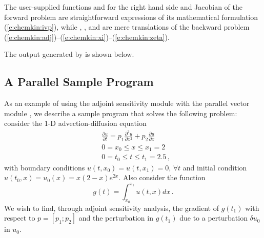 The user-supplied functions  and  for the right hand side and
Jacobian of the forward problem are straightforward expressions of its 
mathematical formulation (\ref{e:chemkin:ivp}), while , , and 
are mere translations of the backward problem
(\ref{e:chemkin:adj})--(\ref{e:chemkin:xi})--(\ref{e:chemkin:zeta}).

The output generated by  is shown below.
{\small}


\subsection{A Parallel Sample Program}\label{ss:parallel_adj_ex}

As an example of using the {\cvodes} adjoint sensitivity module with
the parallel vector module {\nvecp}, we describe a sample program
that solves the following problem: consider the 1-D advection-diffusion
equation
\begin{equation}\label{e:pvanx:orig_pde}
  \begin{split}
    & \frac{\partial u}{\partial t} = p_1 \frac{\partial^2 u}{\partial x^2} 
    + p_2 \frac{\partial u}{\partial x} \\
    & 0 = x_0 \le x \le x_1 = 2 \\
    & 0 = t_0 \le t \le t_1 = 2.5 \, ,
  \end{split}
\end{equation}
with boundary conditions $u(t,x_0) = u(t,x_1) = 0 ,\, \forall t$
and initial condition $u(t_0 , x) = u_0(x) = x(2-x)e^{2x}$. Also
consider the function
\begin{equation*}
  g(t) = \int_{x_0}^{x_1} u(t,x) dx \, .
\end{equation*}
We wish to find, through adjoint sensitivity analysis, the gradient of
$g(t_1)$ with respect to $p = [p_1 ; p_2]$ and the perturbation in $g(t_1)$
due to a perturbation $\delta u_0$ in $u_0$.

